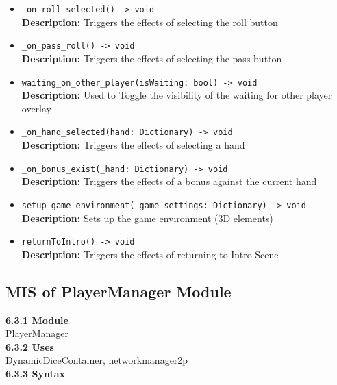 \documentclass[12pt, titlepage]{article}
\begin{document}
\begin{itemize}
    \item \texttt{\_on\_roll\_selected() -> void}\\
    \textbf{Description:} Triggers the effects of selecting the roll button
    
    \item \texttt{\_on\_pass\_roll() -> void}\\
    \textbf{Description:} Triggers the effects of selecting the pass button
    
    \item \texttt{waiting\_on\_other\_player(isWaiting: bool) -> void}\\
    \textbf{Description:} Used to Toggle the visibility of the waiting for other player overlay
    
    \item \texttt{\_on\_hand\_selected(hand: Dictionary) -> void}\\
    \textbf{Description:} Triggers the effects of selecting a hand
    
    \item \texttt{\_on\_bonus\_exist(\_hand: Dictionary) -> void}\\
    \textbf{Description:} Triggers the effects of a bonus against the current hand
    
    \item \texttt{setup\_game\_environment(\_game\_settings: Dictionary) -> void}\\
    \textbf{Description:} Sets up the game environment (3D elements)
    
    \item \texttt{returnToIntro() -> void}\\
    \textbf{Description:} Triggers the effects of returning to Intro Scene
\end{itemize}

\subsection{MIS of PlayerManager Module}\label{PlayerManager}
\textbf{6.3.1 Module}\\
 PlayerManager\\

\noindent \textbf{6.3.2 Uses}\\
DynamicDiceContainer,  networkmanager2p\\

\noindent \textbf{6.3.3 Syntax}
\end{document}
